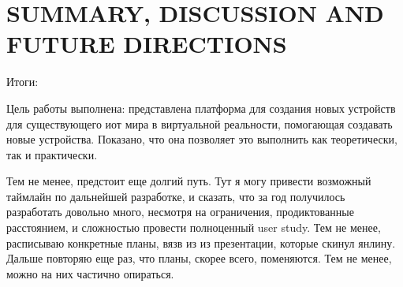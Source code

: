 
\chapter{SUMMARY, DISCUSSION AND FUTURE DIRECTIONS}

Итоги:

Цель работы выполнена: представлена платформа для создания новых устройств для существующего иот мира в виртуальной реальности, помогающая создавать новые устройства. Показано, что она позволяет это выполнить как теоретически, так и практически.

Тем не менее, предстоит еще долгий путь. Тут я могу привести возможный таймлайн по дальнейшей разработке, и сказать, что за год получилось разработать довольно много, несмотря на ограничения, продиктованные расстоянием, и сложностью провести полноценный user study. Тем не менее, расписываю конкретные планы, вязв из из презентации, которые скинул янлину. Дальше повторяю еще раз, что планы, скорее всего, поменяются. Тем не менее, можно на них частично опираться.



